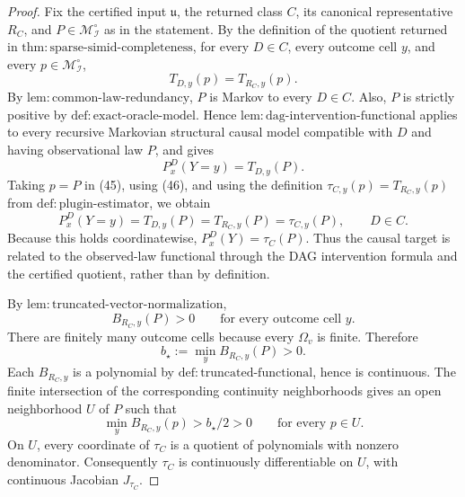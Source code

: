 \documentclass{article}
\begin{document}
\begin{proof}
Fix the certified input \(\mathfrak u\), the returned class \(C\), its canonical representative \(R_C\), and \(P\in\mathcal M_{\mathcal I}^{\circ}\) as in the statement.  By the definition of the quotient returned in \(\mathrm{thm{:}sparse\text{-}simid\text{-}completeness}\), for every \(D\in C\), every outcome cell \(y\), and every \(p\in\mathcal M_{\mathcal I}^{\circ}\),
\[
 T_{D,y}(p)=T_{R_C,y}(p). \tag{45}
\]
By \(\mathrm{lem{:}common\text{-}law\text{-}redundancy}\), \(P\) is Markov to every \(D\in C\).  Also, \(P\) is strictly positive by \(\mathrm{def{:}exact\text{-}oracle\text{-}model}\).  Hence \(\mathrm{lem{:}dag\text{-}intervention\text{-}functional}\) applies to every recursive Markovian structural causal model compatible with \(D\) and having observational law \(P\), and gives
\[
 P_x^D(Y=y)=T_{D,y}(P). \tag{46}
\]
Taking \(p=P\) in (45), using (46), and using the definition \(\tau_{C,y}(p)=T_{R_C,y}(p)\) from \(\mathrm{def{:}plugin\text{-}estimator}\), we obtain
\[
 P_x^D(Y=y)=T_{D,y}(P)=T_{R_C,y}(P)=\tau_{C,y}(P),
 \qquad D\in C. \tag{47}
\]
Because this holds coordinatewise, \(P_x^D(Y)=\tau_C(P)\).  Thus the causal target is related to the observed-law functional through the DAG intervention formula and the certified quotient, rather than by definition.

By \(\mathrm{lem{:}truncated\text{-}vector\text{-}normalization}\),
\[
 B_{R_C,y}(P)>0\qquad\text{for every outcome cell }y. \tag{48}
\]
There are finitely many outcome cells because every \(\Omega_v\) is finite.  Therefore
\[
 b_\star:=\min_y B_{R_C,y}(P)>0. \tag{49}
\]
Each \(B_{R_C,y}\) is a polynomial by \(\mathrm{def{:}truncated\text{-}functional}\), hence is continuous.  The finite intersection of the corresponding continuity neighborhoods gives an open neighborhood \(U\) of \(P\) such that
\[
 \min_y B_{R_C,y}(p)>b_\star/2>0
 \qquad\text{for every }p\in U. \tag{50}
\]
On \(U\), every coordinate of \(\tau_C\) is a quotient of polynomials with nonzero denominator.  Consequently \(\tau_C\) is continuously differentiable on \(U\), with continuous Jacobian \(J_{\tau_C}\).


\end{proof}
\end{document}
